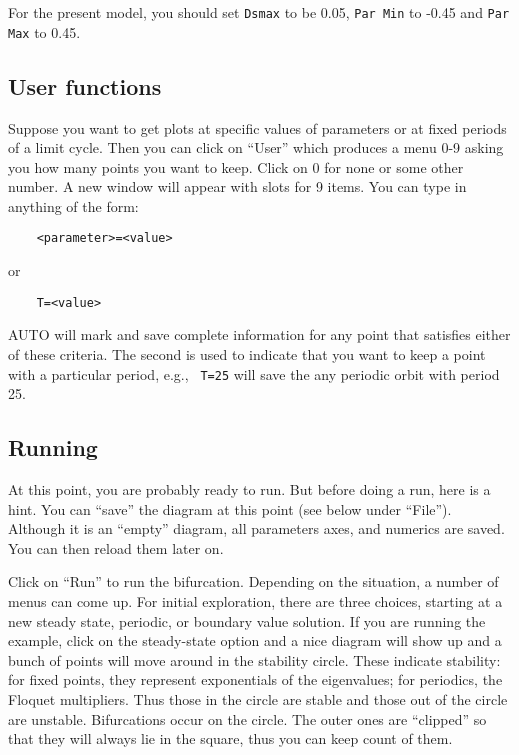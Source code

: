 \documentclass{article}
\begin{document}
For the present model, you should set {\tt Dsmax} to be 0.05, {\tt Par
Min} to -0.45 and {\tt Par Max} to 0.45.

\subsection{User functions}

Suppose you want to get plots at specific values of parameters or at
fixed periods of a limit cycle.  Then you can click on ``User''
which produces a menu 0-9 asking you how many points you want to keep.
Click on 0 for none or some other number.  A new window will appear
with slots for 9 items.  You can type in anything of the form:
\begin{verbatim}
	<parameter>=<value>
\end{verbatim}
or
\begin{verbatim}
	T=<value>
\end{verbatim}
AUTO will mark and save complete information for any point that
satisfies either of these criteria.  The second is used to indicate
that you want to keep a point with a particular period, e.g., {\tt
T=25} will save the any periodic orbit with period 25.

\subsection{Running}
At this point, you are probably ready to run.  But before doing a run,
here is a hint.  You can ``save'' the diagram at this point (see below
under ``File'').  Although it is an ``empty'' diagram, all parameters
axes, and numerics are saved.  You can then reload them later on.

Click on ``Run'' to run the bifurcation.  Depending on the situation,
a number of menus can come up.  For initial exploration, there are three
choices, starting at a new steady state, periodic, or boundary value
solution.
If you are running the
example, click on the steady-state option
and  a nice diagram will show up and a bunch of points will move
around in the stability circle.  These indicate stability: for fixed
points, they represent exponentials of the eigenvalues; for periodics,
the Floquet multipliers. Thus those in
the circle are stable and those out of the circle are unstable.
Bifurcations occur on the circle. The outer ones are ``clipped'' so
that they will always lie in the square, thus you can keep count of
them.
\end{document}
